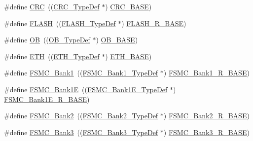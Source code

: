 \begin{DoxyCompactItemize}
\item 
\#define \hyperlink{group___peripheral__declaration_ga4381bb54c2dbc34500521165aa7b89b1}{C\+RC}~((\hyperlink{struct_c_r_c___type_def}{C\+R\+C\+\_\+\+Type\+Def} $\ast$) \hyperlink{openmotestm_2library_2inc_2stm32f10x__map_8h_a656a447589e785594cbf2f45c835ad7e}{C\+R\+C\+\_\+\+B\+A\+SE})
\item 
\#define \hyperlink{group___peripheral__declaration_ga844ea28ba1e0a5a0e497f16b61ea306b}{F\+L\+A\+SH}~((\hyperlink{struct_f_l_a_s_h___type_def}{F\+L\+A\+S\+H\+\_\+\+Type\+Def} $\ast$) \hyperlink{openmotestm_2library_2inc_2stm32f10x__map_8h_a8e21f4845015730c5731763169ec0e9b}{F\+L\+A\+S\+H\+\_\+\+R\+\_\+\+B\+A\+SE})
\item 
\#define \hyperlink{group___peripheral__declaration_gad2d5f875cdc6d696735f20fa23a895c3}{OB}~((\hyperlink{struct_o_b___type_def}{O\+B\+\_\+\+Type\+Def} $\ast$) \hyperlink{openmotestm_2library_2inc_2stm32f10x__map_8h_ab5b5fb155f9ee15dfb6d757da1adc926}{O\+B\+\_\+\+B\+A\+SE})
\item 
\#define \hyperlink{group___peripheral__declaration_ga3a3f60de4318afbd0b3318e7a416aadc}{E\+TH}~((\hyperlink{struct_e_t_h___type_def}{E\+T\+H\+\_\+\+Type\+Def} $\ast$) \hyperlink{group___peripheral__memory__map_gad965a7b1106ece575ed3da10c45c65cc}{E\+T\+H\+\_\+\+B\+A\+SE})
\item 
\#define \hyperlink{group___peripheral__declaration_ga2a759bad07fe730c99f9e1490e646220}{F\+S\+M\+C\+\_\+\+Bank1}~((\hyperlink{struct_f_s_m_c___bank1___type_def}{F\+S\+M\+C\+\_\+\+Bank1\+\_\+\+Type\+Def} $\ast$) \hyperlink{openmotestm_2library_2inc_2stm32f10x__map_8h_ad196fe6f5e4041b201d14f43508c06d2}{F\+S\+M\+C\+\_\+\+Bank1\+\_\+\+R\+\_\+\+B\+A\+SE})
\item 
\#define \hyperlink{group___peripheral__declaration_ga422986101f42a8811ae89ac69deb2759}{F\+S\+M\+C\+\_\+\+Bank1E}~((\hyperlink{struct_f_s_m_c___bank1_e___type_def}{F\+S\+M\+C\+\_\+\+Bank1\+E\+\_\+\+Type\+Def} $\ast$) \hyperlink{openmotestm_2library_2inc_2stm32f10x__map_8h_aea182589c84aee30b7f735474d8774e2}{F\+S\+M\+C\+\_\+\+Bank1\+E\+\_\+\+R\+\_\+\+B\+A\+SE})
\item 
\#define \hyperlink{group___peripheral__declaration_gabb3dfb5e88694aa2983ecabd33a55e0a}{F\+S\+M\+C\+\_\+\+Bank2}~((\hyperlink{struct_f_s_m_c___bank2___type_def}{F\+S\+M\+C\+\_\+\+Bank2\+\_\+\+Type\+Def} $\ast$) \hyperlink{openmotestm_2library_2inc_2stm32f10x__map_8h_a3cb46d62f4f6458e186a5a4c753e4918}{F\+S\+M\+C\+\_\+\+Bank2\+\_\+\+R\+\_\+\+B\+A\+SE})
\item 
\#define \hyperlink{group___peripheral__declaration_ga411eedc00b5b2b22b494004d4f41b736}{F\+S\+M\+C\+\_\+\+Bank3}~((\hyperlink{struct_f_s_m_c___bank3___type_def}{F\+S\+M\+C\+\_\+\+Bank3\+\_\+\+Type\+Def} $\ast$) \hyperlink{openmotestm_2library_2inc_2stm32f10x__map_8h_acf056152c9e5aefcc67db78d1302c0d7}{F\+S\+M\+C\+\_\+\+Bank3\+\_\+\+R\+\_\+\+B\+A\+SE})

\end{DoxyCompactItemize}
